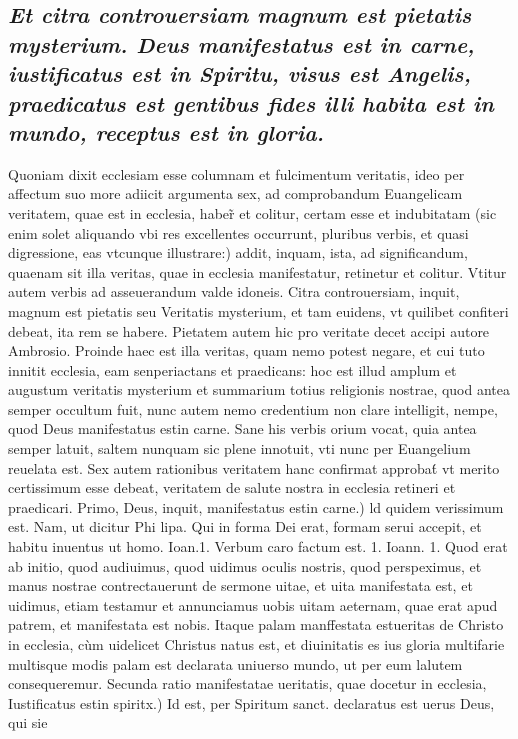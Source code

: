 \documentclass{article}
\begin{document}
\begin{pages}
\subsection*{\textit{Et citra controuersiam magnum est pietatis mysterium. Deus manifestatus est in carne, iustificatus est in Spiritu, visus est Angelis, praedicatus est gentibus fides illi habita est in mundo, receptus est in gloria. }}\pstart Quoniam dixit ecclesiam esse columnam et fulcimentum veritatis, ideo per affectum suo more adiicit argumenta sex, ad comprobandum Euangelicam veritatem, quae est in ecclesia, haber̃ et colitur, certam esse et indubitatam (sic enim solet aliquando vbi res excellentes occurrunt, pluribus verbis, et quasi digressione, eas vtcunque illustrare:) addit, inquam, ista, ad significandum, quaenam sit illa veritas, quae in ecclesia manifestatur, retinetur et colitur. Vtitur autem verbis ad asseuerandum valde idoneis. Citra controuersiam, inquit, magnum est pietatis seu Veritatis mysterium, et tam euidens, vt quilibet confiteri debeat, ita rem se habere. Pietatem autem hic pro veritate decet accipi autore Ambrosio. Proinde haec est illa veritas, quam nemo potest negare, et cui tuto innitit ecclesia, eam senperiactans et praedicans: hoc est illud amplum et augustum veritatis mysterium et summarium totius religionis nostrae, quod antea semper occultum fuit, nunc autem nemo credentium non clare intelligit, nempe, quod Deus manifestatus estin carne. Sane his verbis orium vocat, quia antea semper latuit, saltem nunquam sic plene innotuit, vti nunc per Euangelium reuelata est. Sex autem rationibus veritatem hanc confirmat approbat́ vt merito certissimum esse debeat, veritatem de salute nostra in ecclesia retineri et praedicari. Primo,  \pend\pstart Deus, inquit, manifestatus estin carne.) ld quidem verissimum est. Nam, ut dicitur Phi lipa. Qui in forma Dei erat, formam serui accepit, et habitu inuentus ut homo. Ioan.1. Verbum caro factum est. 1. Ioann. 1. Quod erat ab initio, quod audiuimus, quod uidimus oculis nostris, quod perspeximus, et manus nostrae contrectauerunt de sermone uitae, et uita manifestata est, et uidimus, etiam testamur et annunciamus uobis uitam aeternam, quae erat apud patrem, et manifestata est nobis. Itaque palam manffestata estueritas de Christo in ecclesia, cùm uidelicet Christus natus est, et diuinitatis es ius gloria multifarie multisque modis palam est declarata uniuerso mundo, ut per eum lalutem consequeremur.  \pend\pstart Secunda ratio manifestatae ueritatis, quae docetur in ecclesia, Iustificatus estin spiritx.) Id est, per Spiritum sanct. declaratus est uerus Deus, qui sie  \pend

\end{pages}
\end{document}
